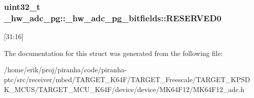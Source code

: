 \subsubsection[{\texorpdfstring{R\+E\+S\+E\+R\+V\+E\+D0}{RESERVED0}}]{\setlength{\rightskip}{0pt plus 5cm}uint32\+\_\+t \+\_\+hw\+\_\+adc\+\_\+pg\+::\+\_\+hw\+\_\+adc\+\_\+pg\+\_\+bitfields\+::\+R\+E\+S\+E\+R\+V\+E\+D0}\hypertarget{struct__hw__adc__pg_1_1__hw__adc__pg__bitfields_a222cd4893465c503d06675c00f989599}{}\label{struct__hw__adc__pg_1_1__hw__adc__pg__bitfields_a222cd4893465c503d06675c00f989599}
\mbox{[}31\+:16\mbox{]} 

The documentation for this struct was generated from the following file\+:\begin{DoxyCompactItemize}
\item 
/home/erik/proj/piranha/code/piranha-\/ptc/src/receiver/mbed/\+T\+A\+R\+G\+E\+T\+\_\+\+K64\+F/\+T\+A\+R\+G\+E\+T\+\_\+\+Freescale/\+T\+A\+R\+G\+E\+T\+\_\+\+K\+P\+S\+D\+K\+\_\+\+M\+C\+U\+S/\+T\+A\+R\+G\+E\+T\+\_\+\+M\+C\+U\+\_\+\+K64\+F/device/device/\+M\+K64\+F12/M\+K64\+F12\+\_\+adc.\+h\end{DoxyCompactItemize}
